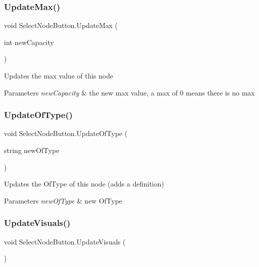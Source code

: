 \subsubsection{\texorpdfstring{Update\+Max()}{UpdateMax()}}
{\footnotesize\ttfamily void Select\+Node\+Button.\+Update\+Max (\begin{DoxyParamCaption}\item[{int}]{new\+Capacity }\end{DoxyParamCaption})}



Updates the max value of this node 


\begin{DoxyParams}{Parameters}
{\em new\+Capacity} & the new max value, a max of 0 means there is no max \\
\hline
\end{DoxyParams}
\mbox{\label{class_select_node_button_a021920607dcc21a0f404e5e31ec4e8f0}} 
\subsubsection{\texorpdfstring{Update\+Of\+Type()}{UpdateOfType()}}
{\footnotesize\ttfamily void Select\+Node\+Button.\+Update\+Of\+Type (\begin{DoxyParamCaption}\item[{string}]{new\+Of\+Type }\end{DoxyParamCaption})}



Updates the Of\+Type of this node (adds a definition) 


\begin{DoxyParams}{Parameters}
{\em new\+Of\+Type} & new Of\+Type \\
\hline
\end{DoxyParams}
\mbox{\label{class_select_node_button_a0b21ceeb215b5732c7331efa2fb2f434}} 
\subsubsection{\texorpdfstring{Update\+Visuals()}{UpdateVisuals()}}
{\footnotesize\ttfamily void Select\+Node\+Button.\+Update\+Visuals (\begin{DoxyParamCaption}{ }\end{DoxyParamCaption})}



